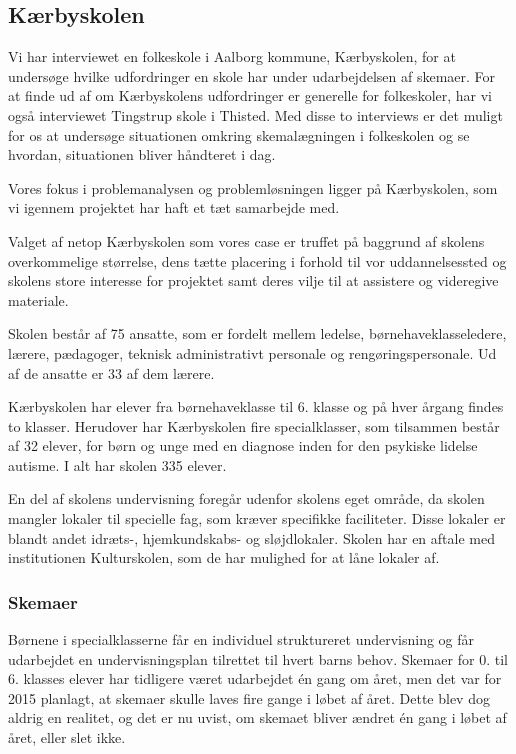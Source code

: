 \subsection{Kærbyskolen}
\label{Kaerbyskolen}
Vi har interviewet en folkeskole i Aalborg kommune, Kærbyskolen, for at undersøge hvilke udfordringer en skole har under udarbejdelsen af skemaer. For at finde ud af om Kærbyskolens udfordringer er generelle for folkeskoler, har vi også interviewet Tingstrup skole i Thisted. Med disse to interviews er det muligt for os at undersøge situationen omkring skemalægningen i folkeskolen og se hvordan, situationen bliver håndteret i dag.


Vores fokus i problemanalysen og problemløsningen ligger på Kærbyskolen, som vi igennem projektet har haft et tæt samarbejde med.

Valget af netop Kærbyskolen som vores case er truffet på baggrund af skolens overkommelige størrelse, dens tætte placering i forhold til vor uddannelsessted og skolens store interesse for projektet samt deres vilje til at assistere og videregive materiale.

Skolen består af 75 ansatte, som er fordelt mellem ledelse, børnehaveklasseledere, lærere, pædagoger, teknisk administrativt personale og rengøringspersonale. Ud af de ansatte er 33 af dem lærere\cite{Kaerbyskolens-laerere}.

Kærbyskolen har elever fra børnehaveklasse til 6. klasse og på hver årgang findes to klasser. Herudover har Kærbyskolen fire specialklasser, som tilsammen består af 32 elever\cite{KaerbyskolensElevtal}, for børn og unge med en diagnose inden for den psykiske lidelse autisme. I alt har skolen 335 elever.

En del af skolens undervisning foregår udenfor skolens eget område, da skolen mangler lokaler til specielle fag, som kræver specifikke faciliteter. Disse lokaler er blandt andet idræts-, hjemkundskabs- og sløjdlokaler. Skolen har en aftale med institutionen Kulturskolen, som de har mulighed for at låne lokaler af.






\subsubsection*{Skemaer}
Børnene i specialklasserne får en individuel struktureret undervisning og får udarbejdet en undervisningsplan tilrettet til hvert barns behov\cite{j_klasser}.
Skemaer for 0. til 6. klasses elever har tidligere været udarbejdet \'en gang om året, men det var for 2015 planlagt, at skemaer skulle laves fire gange i løbet af året. Dette blev dog aldrig en realitet, og det er nu uvist, om skemaet bliver ændret \'en gang i løbet af året, eller slet ikke.

